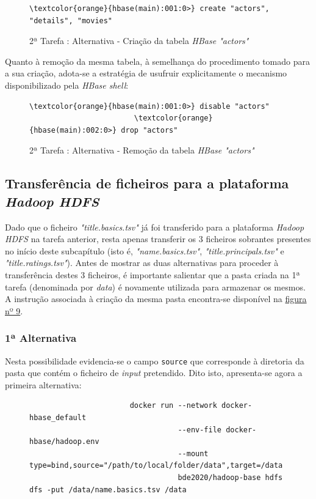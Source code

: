 \documentclass[a4paper]{report}
\begin{document}
{			\begin{figure}[H]
				{
					\color{teal}
					\begin{Verbatim}[commandchars=\\\{\}]
              \textcolor{orange}{hbase(main):001:0>} create "actors", "details", "movies"
					\end{Verbatim}
				}
				\caption{2ª Tarefa : Alternativa - Criação da tabela \textit{HBase "actors"}}
				\label{fig:14}
			\end{figure}
			
			Quanto à remoção da mesma tabela, à semelhança do procedimento tomado para a sua criação, adota-se a estratégia de usufruir explicitamente o mecanismo disponibilizado pela \textit{HBase shell}:
			\begin{figure}[H]
				{
					\color{teal}
					\begin{Verbatim}[commandchars=\\\{\}]
                        \textcolor{orange}{hbase(main):001:0>} disable "actors"
                        \textcolor{orange}{hbase(main):002:0>} drop "actors"
					\end{Verbatim}
				}
				\caption{2ª Tarefa : Alternativa - Remoção da tabela \textit{HBase "actors"}}
				\label{fig:15}
			\end{figure}

		\subsection{Transferência de ficheiros para a plataforma \textit{Hadoop HDFS}} \label{subsec:Task2-2}
		Dado que o ficheiro \textit{"title.basics.tsv"} já foi transferido para a plataforma \textit{Hadoop HDFS} na tarefa anterior, resta apenas transferir os 3 ficheiros sobrantes presentes no início deste subcapítulo (isto é, \textit{"name.basics.tsv"}, \textit{"title.principals.tsv"} e \textit{"title.ratings.tsv"}).
		Antes de mostrar as duas alternativas para proceder à transferência destes 3 ficheiros, é importante salientar que a pasta criada na 1ª tarefa (denominada por \textit{data}) é novamente utilizada para armazenar os mesmos. A instrução associada à criação da mesma pasta encontra-se disponível na \hyperref[fig:9]{figura nº 9}.

			\subsubsection{1ª Alternativa}
			Nesta possibilidade evidencia-se o campo \texttt{source} que corresponde à diretoria da pasta que contém o ficheiro de \textit{input} pretendido.
			Dito isto, apresenta-se agora a primeira alternativa:
			\begin{figure}[H]
				{
					\color{teal}
					\begin{verbatim}
					   docker run --network docker-hbase_default
					              --env-file docker-hbase/hadoop.env
					              --mount type=bind,source="/path/to/local/folder/data",target=/data
					              bde2020/hadoop-base hdfs dfs -put /data/name.basics.tsv /data
								  

\end{verbatim}}
\end{figure}}
\end{document}
